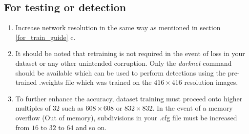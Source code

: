 \subsection{For testing or detection}

\begin{enumerate}
  \item Increase network resolution in the same way as mentioned in section \ref{for_train_guide} c.
  \item It should be noted that retraining is not required in the event of loss in your dataset or any other unintended corruption. Only the \textit{darknet} command should be available which can be used to perform detections using the pre-trained {\selectfont .weights} file which was trained on the $416 \times 416$ resolution images.
  \item To further enhance the accuracy, dataset training must proceed onto higher multiples of  $32$ such as $608 \times 608$ or $832 \times 832$. In the event of a memory overflow ({\selectfont Out of memory}), {\selectfont subdivisions} in your {\selectfont .cfg} file must be increased from $16$ to $32$ to $64$ and so on.
\end{enumerate}
